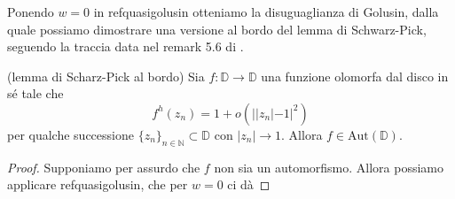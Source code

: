 Ponendo $w=0$ in ref{quasigolusin} otteniamo la disuguaglianza di Golusin, dalla quale possiamo dimostrare una versione al bordo del lemma di Schwarz-Pick, seguendo la traccia data nel remark 5.6 di \cite{BKR}.

\begin{thm} \label{boundary_schwarz_pick}
  (lemma di Scharz-Pick al bordo) Sia $f:\mathbb{D} \longrightarrow \mathbb{D}$ una funzione olomorfa dal disco in sé tale che
  \begin{equation}
    f^h(z_n)=1+o(||z_n|-1|^2)
  \end{equation}
  per qualche successione $\{z_n\}_{n \in \mathbb{N}} \subset \mathbb{D}$ con $|z_n| \longrightarrow 1$. Allora $f \in \text{Aut}(\mathbb{D})$.
\end{thm}


\begin{proof}
  Supponiamo per assurdo che $f$ non sia un automorfismo. Allora possiamo applicare ref{quasigolusin}, che per $w=0$ ci dà
\end{proof}

